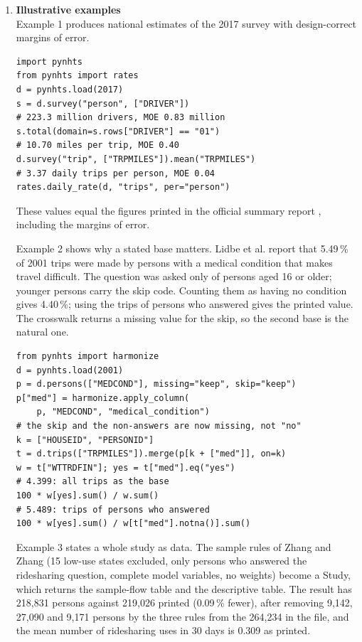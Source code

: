 \documentclass[preprint,12pt, a4paper]{elsarticle}
\begin{document}
\begin{enumerate}
\item \textbf{Illustrative examples}\label{sec:examples}\\

Example 1 produces national estimates of the 2017 survey with design-correct margins of error.

\begin{footnotesize}\begin{verbatim}
import pynhts
from pynhts import rates
d = pynhts.load(2017)
s = d.survey("person", ["DRIVER"])
# 223.3 million drivers, MOE 0.83 million
s.total(domain=s.rows["DRIVER"] == "01")
# 10.70 miles per trip, MOE 0.40
d.survey("trip", ["TRPMILES"]).mean("TRPMILES")
# 3.37 daily trips per person, MOE 0.04
rates.daily_rate(d, "trips", per="person")
\end{verbatim}\end{footnotesize}

These values equal the figures printed in the official summary report \cite{mcguckin}, including the margins of error.

Example 2 shows why a stated base matters. Lidbe et al. \cite{lidbe} report that 5.49\,\% of 2001 trips were made by persons with a medical condition that makes travel difficult. The question was asked only of persons aged 16 or older; younger persons carry the skip code. Counting them as having no condition gives 4.40\,\%; using the trips of persons who answered gives the printed value. The crosswalk returns a missing value for the skip, so the second base is the natural one.

\begin{footnotesize}\begin{verbatim}
from pynhts import harmonize
d = pynhts.load(2001)
p = d.persons(["MEDCOND"], missing="keep", skip="keep")
p["med"] = harmonize.apply_column(
    p, "MEDCOND", "medical_condition")
# the skip and the non-answers are now missing, not "no"
k = ["HOUSEID", "PERSONID"]
t = d.trips(["TRPMILES"]).merge(p[k + ["med"]], on=k)
w = t["WTTRDFIN"]; yes = t["med"].eq("yes")
# 4.399: all trips as the base
100 * w[yes].sum() / w.sum()
# 5.489: trips of persons who answered
100 * w[yes].sum() / w[t["med"].notna()].sum()
\end{verbatim}\end{footnotesize}

Example 3 states a whole study as data. The sample rules of Zhang and Zhang \cite{zhang} (15 low-use states excluded, only persons who answered the ridesharing question, complete model variables, no weights) become a Study, which returns the sample-flow table and the descriptive table. The result has 218,831 persons against 219,026 printed (0.09\,\% fewer), after removing 9,142, 27,090 and 9,171 persons by the three rules from the 264,234 in the file, and the mean number of ridesharing uses in 30 days is 0.309 as printed.


\end{enumerate}
\end{document}

